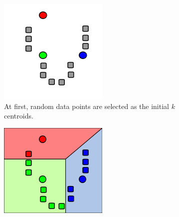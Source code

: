 \begin{figure}[ht]
    \centering
    \begin{subfigure}[t]{0.22\textwidth}
        \includegraphics[width=\textwidth]{Figures/k-means/k-means_inicial_step.png}
        \caption{At first, random data points are selected as the initial $k$ centroids.}
        \label{fig:k-means-alg:inicial_step}
    \end{subfigure}\hfill
    \begin{subfigure}[t]{0.22\textwidth}
        \includegraphics[width=\textwidth]{Figures/k-means/k-means_assignment_step.png}

\end{subfigure}
\end{figure}
